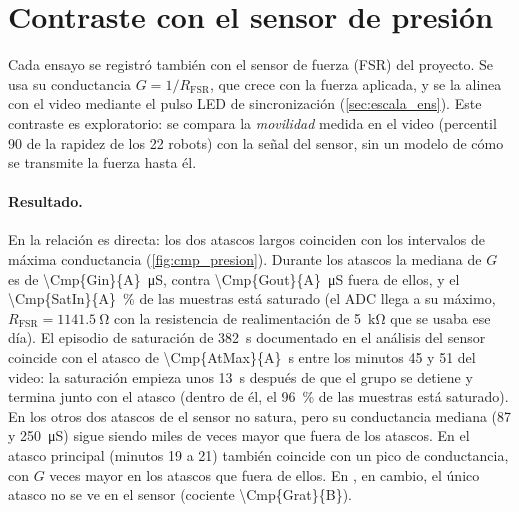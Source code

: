 \section{Contraste con el sensor de presión}\label{sec:presion}

Cada ensayo se registró también con el sensor de fuerza (FSR) del proyecto. Se usa su conductancia
$G = 1/R_{\mathrm{FSR}}$, que crece con la fuerza aplicada, y se la alinea con el video mediante el
pulso LED de sincronización (\cref{sec:escala_ens}). Este contraste es exploratorio: se compara la
\emph{movilidad} medida en el video (percentil 90 de la rapidez de los 22 robots) con la señal del
sensor, sin un modelo de cómo se transmite la fuerza hasta él.


\paragraph{Resultado.} En  la relación es directa: los dos atascos largos coinciden con
los intervalos de máxima conductancia (\cref{fig:cmp_presion}). Durante los atascos la mediana de $G$
es de \SI{\Cmp{Gin}{A}}{\micro\siemens}, contra \SI{\Cmp{Gout}{A}}{\micro\siemens} fuera de ellos, y el
\SI{\Cmp{SatIn}{A}}{\percent} de las muestras está saturado (el ADC llega a su máximo, $R_{\mathrm{FSR}}
= \SI{1141.5}{\ohm}$ con la resistencia de realimentación de \SI{5}{\kilo\ohm} que se usaba ese día). El
episodio de saturación de \SI{382}{\second} documentado en el análisis del sensor coincide con el
atasco de \SI{\Cmp{AtMax}{A}}{\second} entre los minutos 45 y 51 del video: la saturación empieza
unos \SI{13}{\second} después de que el grupo se detiene y termina junto con el atasco (dentro de él,
el \SI{96}{\percent} de las muestras está saturado). En los otros dos atascos de  el sensor
no satura, pero su conductancia mediana (\num{87} y \SI{250}{\micro\siemens}) sigue siendo miles de
veces mayor que fuera de los atascos. En  el atasco
principal (minutos 19 a 21) también coincide con un pico de conductancia, con $G$  veces
mayor en los atascos que fuera de ellos. En , en cambio, el único atasco no se ve en el
sensor (cociente \num{\Cmp{Grat}{B}}).

